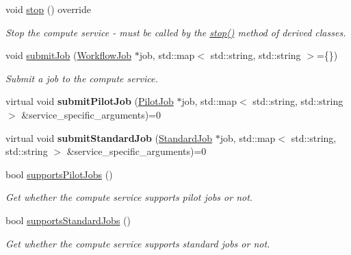 \begin{DoxyCompactItemize}
\mbox{\label{classwrench_1_1_compute_service_a289d4a0c5254772575340095b73cf7d4}} 
void \hyperlink{classwrench_1_1_compute_service_a289d4a0c5254772575340095b73cf7d4}{stop} () override
\begin{DoxyCompactList}\small\item\em Stop the compute service -\/ must be called by the \hyperlink{classwrench_1_1_compute_service_a289d4a0c5254772575340095b73cf7d4}{stop()} method of derived classes. \end{DoxyCompactList}\item 
void \hyperlink{classwrench_1_1_compute_service_abc9e51234c29965341727f07b446ff0c}{submit\+Job} (\hyperlink{classwrench_1_1_workflow_job}{Workflow\+Job} $\ast$job, std\+::map$<$ std\+::string, std\+::string $>$=\{\})
\begin{DoxyCompactList}\small\item\em Submit a job to the compute service. \end{DoxyCompactList}\item 
\mbox{\label{classwrench_1_1_compute_service_a96d4857d6e9ec654d8d48b046a87924d}} 
virtual void {\bfseries submit\+Pilot\+Job} (\hyperlink{classwrench_1_1_pilot_job}{Pilot\+Job} $\ast$job, std\+::map$<$ std\+::string, std\+::string $>$ \&service\+\_\+specific\+\_\+arguments)=0
\item 
\mbox{\label{classwrench_1_1_compute_service_a3b6015d44a0410b957346ccbc29f715d}} 
virtual void {\bfseries submit\+Standard\+Job} (\hyperlink{classwrench_1_1_standard_job}{Standard\+Job} $\ast$job, std\+::map$<$ std\+::string, std\+::string $>$ \&service\+\_\+specific\+\_\+arguments)=0
\item 
bool \hyperlink{classwrench_1_1_compute_service_acd8cd30b0c6a7f23be2a16e9c8910822}{supports\+Pilot\+Jobs} ()
\begin{DoxyCompactList}\small\item\em Get whether the compute service supports pilot jobs or not. \end{DoxyCompactList}\item 
bool \hyperlink{classwrench_1_1_compute_service_a0f15f4038c447b0f580b9d2a7bf0cd22}{supports\+Standard\+Jobs} ()
\begin{DoxyCompactList}\small\item\em Get whether the compute service supports standard jobs or not. \end{DoxyCompactList}\item 

\end{DoxyCompactItemize}
